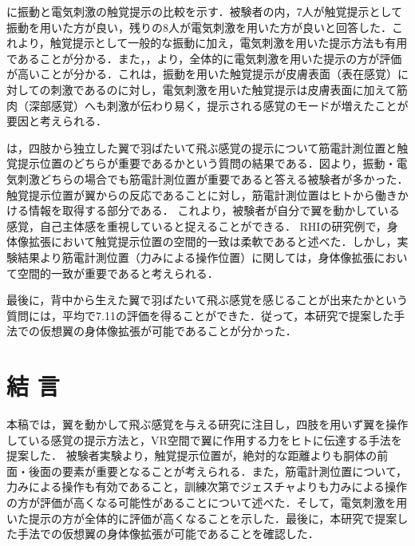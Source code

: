 \begin{small}
        に振動と電気刺激の触覚提示の比較を示す．被験者の内，7人が触覚提示として振動を用いた方が良い，残りの8人が電気刺激を用いた方が良いと回答した．これより，触覚提示として一般的な振動に加え，電気刺激を用いた提示方法も有用であることが分かる．また，，より，全体的に電気刺激を用いた提示の方が評価が高いことが分かる．これは，振動を用いた触覚提示が皮膚表面（表在感覚）に対しての刺激であるのに対し，電気刺激を用いた触覚提示は皮膚表面に加えて筋肉（深部感覚）へも刺激が伝わり易く，提示される感覚のモードが増えたことが要因と考えられる．

        は，四肢から独立した翼で羽ばたいて飛ぶ感覚の提示について筋電計測位置と触覚提示位置のどちらが重要であるかという質問の結果である．図より，振動・電気刺激どちらの場合でも筋電計測位置が重要であると答える被験者が多かった．
        触覚提示位置が翼からの反応であることに対し，筋電計測位置はヒトから働きかける情報を取得する部分である．
        これより，被験者が自分で翼を動かしている感覚，自己主体感を重視していると捉えることができる．
        RHIの研究例で，身体像拡張において触覚提示位置の空間的一致は柔軟であると述べた．しかし，実験結果より筋電計測位置（力みによる操作位置）に関しては，身体像拡張において空間的一致が重要であると考えられる．


        最後に，背中から生えた翼で羽ばたいて飛ぶ感覚を感じることが出来たかという質問には，平均で7.11の評価を得ることができた．従って，本研究で提案した手法での仮想翼の身体像拡張が可能であることが分かった．


\section{結   言}
    本稿では，翼を動かして飛ぶ感覚を与える研究に注目し，四肢を用いず翼を操作している感覚の提示方法と，VR空間で翼に作用する力をヒトに伝達する手法を提案した．
    被験者実験より，触覚提示位置が，絶対的な距離よりも胴体の前面・後面の要素が重要となることが考えられる．また，筋電計測位置について，力みによる操作も有効であること，訓練次第でジェスチャよりも力みによる操作の方が評価が高くなる可能性があることについて述べた．そして，電気刺激を用いた提示の方が全体的に評価が高くなることを示した．最後に，本研究で提案した手法での仮想翼の身体像拡張が可能であることを確認した．
    

\end{small}
